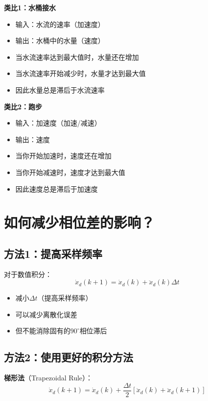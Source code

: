 \documentclass[12pt,a4paper]{article}
\begin{document}
\begin{enumerate}
\textbf{类比1：水桶接水}
\begin{itemize}
\item 输入：水流的速率（加速度）
\item 输出：水桶中的水量（速度）
\item 当水流速率达到最大值时，水量还在增加
\item 当水流速率开始减少时，水量才达到最大值
\item 因此水量总是滞后于水流速率
\end{itemize}

\textbf{类比2：跑步}
\begin{itemize}
\item 输入：加速度（加速/减速）
\item 输出：速度
\item 当你开始加速时，速度还在增加
\item 当你开始减速时，速度才达到最大值
\item 因此速度总是滞后于加速度
\end{itemize}

\section{如何减少相位差的影响？}

\subsection{方法1：提高采样频率}

对于数值积分：
\begin{equation}
\dot{x}_d(k+1) = \dot{x}_d(k) + \ddot{x}_d(k) \Delta t
\end{equation}

\begin{itemize}
\item 减小$\Delta t$（提高采样频率）
\item 可以减少离散化误差
\item 但不能消除固有的$90^\circ$相位滞后
\end{itemize}

\subsection{方法2：使用更好的积分方法}

\textbf{梯形法}（Trapezoidal Rule）：
\begin{equation}
\dot{x}_d(k+1) = \dot{x}_d(k) + \frac{\Delta t}{2}[\ddot{x}_d(k) + \ddot{x}_d(k+1)]
\end{equation}


\end{enumerate}
\end{document}
